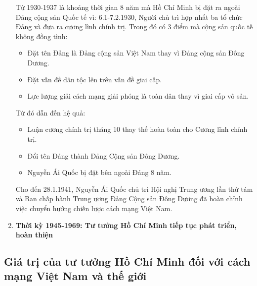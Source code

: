 \documentclass{article}
\begin{document}
\begin{enumerate}
		Từ 1930-1937 là khoảng thời gian 8 năm mà Hồ Chí Minh bị đặt ra ngoài Đảng cộng sản Quốc tế vì: 6.1-7.2.1930, Người chủ trì hợp nhất ba tổ chức Đảng và đưa ra cương lình chính trị. Trong đó có 3 điểm mà cộng sản quốc tế không đồng tình:
		\begin{itemize}
			\item Đặt tên Đảng là Đảng cộng sản Việt Nam thay vì Đảng cộng sản Đông Dương.
			\item Đặt vấn đề dân tộc lên trên vấn đề giai cấp.
			\item Lực lượng giải cách mạng giải phóng là toàn dân thay vì giai cấp vô sản.
		\end{itemize}
		Từ đó dẫn đến hệ quả:
		\begin{itemize}
			\item Luận cương chính trị tháng 10 thay thế hoàn toàn cho Cương lĩnh chính trị.
			\item Đổi tên Dảng thành Đảng Cộng sản Đông Dương.
			\item Nguyễn Ái Quốc bị đặt bên ngoài Đảng 8 năm.
		\end{itemize}
		Cho đến 28.1.1941, Nguyễn Ái Quốc chủ trì Hội nghị Trung ương lần thứ tám và Ban chấp hành Trung ương Đảng Cộng sản Đông Dương đã hoàn chỉnh việc chuyển hướng chiến lược cách mạng Việt Nam.
		\item \textbf{Thời kỳ 1945-1969: Tư tưởng Hồ Chí Minh tiếp tục phát triển, hoàn thiện}
	\end{enumerate}

	\subsection{Giá trị của tư tưởng Hồ Chí Minh đối với cách mạng Việt Nam và thế giới}
\end{document}

